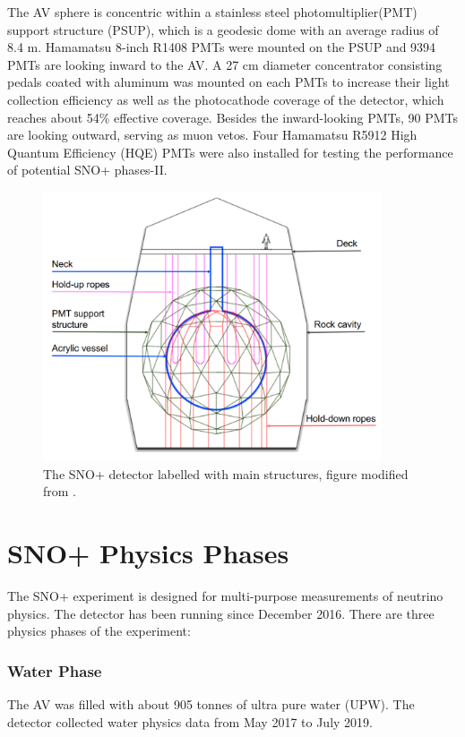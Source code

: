 The AV sphere is concentric within a stainless steel photomultiplier(PMT) support structure (PSUP), which is a geodesic dome with an average radius of 8.4 m. Hamamatsu 8-inch R1408 PMTs were mounted on the PSUP and 9394 PMTs are looking inward to the AV. A 27 cm diameter concentrator consisting pedals coated with aluminum was mounted on each PMTs to increase their light collection efficiency as well as the photocathode coverage of the detector, which reaches about 54\% effective coverage. Besides the inward-looking PMTs, 90 PMTs are looking outward, serving as muon vetos.  Four Hamamatsu R5912 High Quantum Efficiency (HQE) PMTs were also installed for testing the performance of potential SNO+ phases-II\cite{stringer2019sensitivity}. 

\begin{figure}[htbp]
	\centering
	\includegraphics[width=10cm]{SNOPdetector.png}
	\caption{The SNO+ detector labelled with main structures, figure modified from \cite{jones2011background}.}
	\label{snopdetector}
\end{figure}

\section{SNO+ Physics Phases}
The SNO+ experiment is designed for multi-purpose measurements of neutrino physics. The detector has been running since December 2016. There are three physics phases of the experiment\cite{whitepaper}: 

\subsubsection{Water Phase} 

The AV was filled with about 905 tonnes of ultra pure water (UPW). The detector collected water physics data from May 2017 to July 2019.

